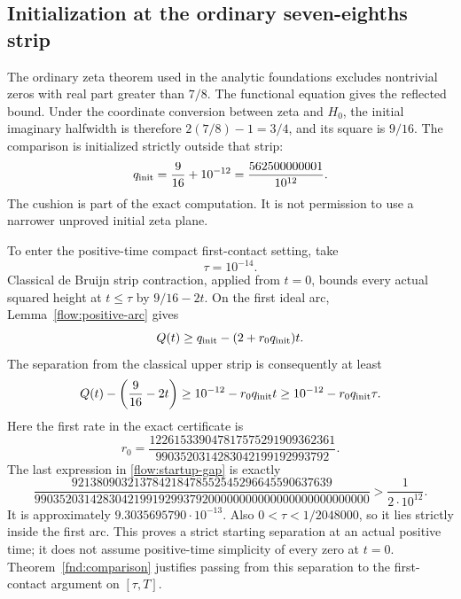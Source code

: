 \documentclass[11pt,a4paper]{article}
\theoremstyle{definition}
\theoremstyle{remark}
\begin{document}
\subsection{Initialization at the ordinary seven-eighths strip}
\label{flow:startup}

The ordinary zeta theorem used in the analytic foundations excludes
nontrivial zeros with real part greater than $7/8$.  The functional
equation gives the reflected bound.  Under the coordinate conversion
between zeta and $H_0$, the initial imaginary halfwidth is therefore
$2(7/8)-1=3/4$, and its square is $9/16$.  The comparison is initialized
strictly outside that strip:
\begin{equation}
 q_{\rm init}=\frac9{16}+10^{-12}
             =\frac{562500000001}{10^{12}}.
 \label{flow:initial}
\end{equation}
The cushion is part of the exact computation.  It is not permission to
use a narrower unproved initial zeta plane.

To enter the positive-time compact first-contact setting, take
\begin{equation}
 \tau=10^{-14}.
 \label{flow:tau}
\end{equation}
Classical de Bruijn strip contraction, applied from $t=0$, bounds every
actual squared height at $t\leq\tau$ by $9/16-2t$.  On the first ideal
arc, Lemma~\ref{flow:positive-arc} gives
\[
 Q(t)\geq q_{\rm init}-(2+r_0q_{\rm init})t.
\]
The separation from the classical upper strip is consequently at least
\begin{equation}
 Q(t)-\left(\frac9{16}-2t\right)
 \geq10^{-12}-r_0q_{\rm init}t
 \geq10^{-12}-r_0q_{\rm init}\tau.
 \label{flow:startup-gap}
\end{equation}
Here the first rate in the exact certificate is
\[
 r_0=\frac{122615339047817575291909362361}
 {9903520314283042199192993792}.
\]
The last expression in \eqref{flow:startup-gap} is exactly
\begin{equation}
 \frac{921380903213784218478552545296645590637639}
 {990352031428304219919299379200000000000000000000000000}
 >\frac1{2\cdot10^{12}}.
 \label{flow:startup-exact}
\end{equation}
It is approximately $9.3035695790\cdot10^{-13}$.  Also
$0<\tau<1/2048000$, so it lies strictly inside the first arc.
This proves a strict starting separation at an actual positive time;
it does not assume positive-time simplicity of every zero at $t=0$.
Theorem~\ref{fnd:comparison} justifies passing from this separation to the
first-contact argument on $[\tau,T]$.
\end{document}
